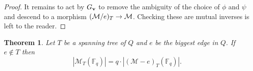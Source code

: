 \documentclass{amsart}
\newtheorem{thm}{Theorem}[section]
\theoremstyle{definition}
\begin{document}
\begin{proof}
It remains to act by $G_{\mathbf{v}}$ to remove the ambiguity of the choice of $\phi$ and $\psi$ and descend to a morphism $(\mathcal{M}/e)_T \rightarrow \mathcal{M}$.
Checking these are mutual inverses is left to the reader.
\end{proof}

\begin{thm}\label{thm:delete}
Let $T$ be a spanning tree of $Q$ and $e$ be the biggest edge in $Q$.
If $e \notin T$ then $$|\mathcal{M}_T(\mathbb{F}_q)| = q \cdot |(\mathcal{M}-e)_T(\mathbb{F}_q)|.$$
\end{thm}
\end{document}
